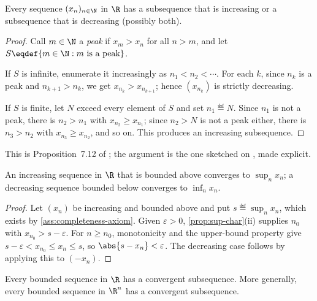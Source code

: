 \begin{proposition}\label{prop:monotone-subseq}
	Every sequence $(x_n)_{n\in\N}$ in $\R$ has a subsequence that is increasing or
	a subsequence that is decreasing (possibly both).
\end{proposition}

\begin{proof}
	Call $m\in\N$ a \emph{peak} if $x_m>x_n$ for all $n>m$, and let
	$S\eqdef\{m\in\N : m\text{ is a peak}\}$.

	If $S$ is infinite, enumerate it increasingly as $n_1<n_2<\cdots$. For each $k$,
	since $n_k$ is a peak and $n_{k+1}>n_k$, we get $x_{n_k}>x_{n_{k+1}}$; hence
	$(x_{n_k})$ is strictly decreasing.

	If $S$ is finite, let $N$ exceed every element of $S$ and set $n_1\eqdef N$.
	Since $n_1$ is not a peak, there is $n_2>n_1$ with $x_{n_2}\geq x_{n_1}$; since
	$n_2>N$ is not a peak either, there is $n_3>n_2$ with $x_{n_3}\geq x_{n_2}$, and
	so on. This produces an increasing subsequence.
\end{proof}

This is Proposition~7.12 of \textcite{fukuda2026notes}; the argument is the one
sketched on \autocite[slides 45--46]{fukuda2026analysis}, made explicit.

\begin{proposition}\label{prop:monotone-convergence}
	An increasing sequence in $\R$ that is bounded above converges to
	$\sup_n x_n$; a decreasing sequence bounded below converges to $\inf_n x_n$.
\end{proposition}

\begin{proof}
	Let $(x_n)$ be increasing and bounded above and put $s\eqdef\sup_nx_n$, which
	exists by \autoref{ass:completeness-axiom}. Given $\varepsilon>0$,
	\autoref{prop:sup-char}(ii) supplies $n_0$ with $x_{n_0}>s-\varepsilon$. For
	$n\geq n_0$, monotonicity and the upper-bound property give
	$s-\varepsilon<x_{n_0}\leq x_n\leq s$, so $\abs{s-x_n}<\varepsilon$. The
	decreasing case follows by applying this to $(-x_n)$.
\end{proof}

\begin{theorem}\label{thm:bolzano-weierstrass}
	Every bounded sequence in $\R$ has a convergent subsequence. More generally,
	every bounded sequence in $\R^n$ has a convergent subsequence.
\end{theorem}

